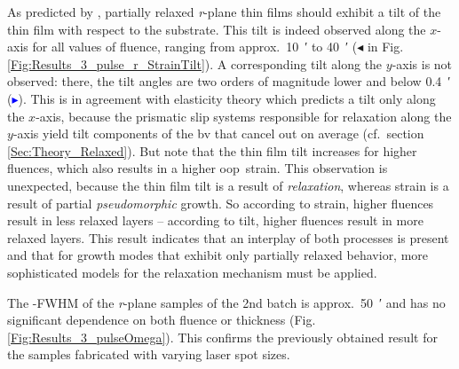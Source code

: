 As predicted by \textcite{grundmann2020b}, partially relaxed \textit{r}-plane thin films should exhibit a tilt of the thin film with respect to the substrate.
This tilt is indeed observed along the $x$-axis for all values of fluence, ranging from approx.\ \qty{10}{\arcminute} to \qty{40}{\arcminute} (\textcolor{col-purple}{$\blacktriangleleft$} in Fig.\,\ref{Fig:Results_3_pulse_r_StrainTilt}).
A corresponding tilt along the $y$-axis is not observed: there, the tilt angles are two orders of magnitude lower and below \qty{0.4}{\arcminute} (\textcolor{blue}{$\blacktriangleright$}).
This is in agreement with elasticity theory which predicts a tilt only along the $x$-axis, because the prismatic slip systems responsible for relaxation along the $y$-axis yield tilt components of the \gls{bv} that cancel out on average (cf.\ section \ref{Sec:Theory_Relaxed}).
But note that the thin film tilt increases for higher fluences, which also results in a higher \gls{oop}\ strain.
This observation is unexpected, because the thin film tilt is a result of \emph{relaxation}, whereas strain is a result of partial \emph{pseudomorphic} growth.
So according to strain, higher fluences result in less relaxed layers -- according to tilt, higher fluences result in more relaxed layers.
This result indicates that an interplay of both processes is present and that for growth modes that exhibit only partially relaxed behavior, more sophisticated models for the relaxation mechanism must be applied.

The \textomega-FWHM of the \textit{r}-plane samples of the 2nd batch is approx.\ \qty{50}{\arcminute} and has no significant dependence on both fluence or thickness (Fig.\,\ref{Fig:Results_3_pulseOmega}).
This confirms the previously obtained result for the samples fabricated with varying laser spot sizes.